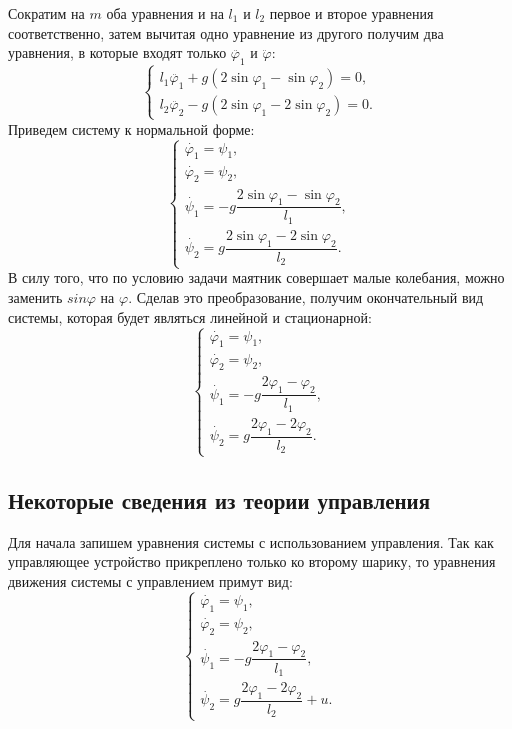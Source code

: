 \documentclass[a4paper, 14pt]{article}
\begin{document}
        Сократим на $m$ оба уравнения и на $l_1$ и $l_2$ первое и второе уравнения соответственно, затем вычитая одно уравнение из другого получим два уравнения, в которые входят только $\ddot{\varphi_1}$ и $\ddot{\varphi}$:
        $$
            \begin{cases}
                l_1 \ddot{\varphi_1} + g (2 \sin \varphi_1 - \sin \varphi_2) = 0, \\
                l_2 \ddot{\varphi_2} - g (2 \sin \varphi_1 - 2 \sin \varphi_2) = 0.
            \end{cases}
        $$
        Приведем систему к нормальной форме:
        $$
            \begin{cases}
                \dot{\varphi_1} = \psi_1, \\
                \dot{\varphi_2} = \psi_2, \\
                \dot{\psi_1} = - g \dfrac{2\sin \varphi_1 - \sin \varphi_2}{l_1}, \\
                \dot{\psi_2} = g \dfrac{2\sin \varphi_1 - 2 \sin \varphi_2}{l_2}.
            \end{cases}
        $$
        В силу того, что по условию задачи маятник совершает малые колебания, можно заменить $sin \varphi$ на $\varphi$. Сделав это преобразование, получим окончательный вид системы, которая будет являться линейной и стационарной:
        $$
            \begin{cases}
                \dot{\varphi_1} = \psi_1, \\
                \dot{\varphi_2} = \psi_2, \\
                \dot{\psi_1} = - g \dfrac{2\varphi_1 - \varphi_2}{l_1}, \\
                \dot{\psi_2} = g \dfrac{2\varphi_1 - 2 \varphi_2}{l_2}.
            \end{cases}
        $$
    \subsection{Некоторые сведения из теории управления}
        Для начала запишем уравнения системы с использованием управления.
        Так как управляющее устройство прикреплено только ко второму шарику, то уравнения движения системы с управлением примут вид:
        $$
            \begin{cases}
                \dot{\varphi_1} = \psi_1, \\
                \dot{\varphi_2} = \psi_2, \\
                \dot{\psi_1} = - g \dfrac{2\varphi_1 - \varphi_2}{l_1}, \\
                \dot{\psi_2} = g \dfrac{2\varphi_1 - 2 \varphi_2}{l_2} + u.
            \end{cases}
        $$
\end{document}
